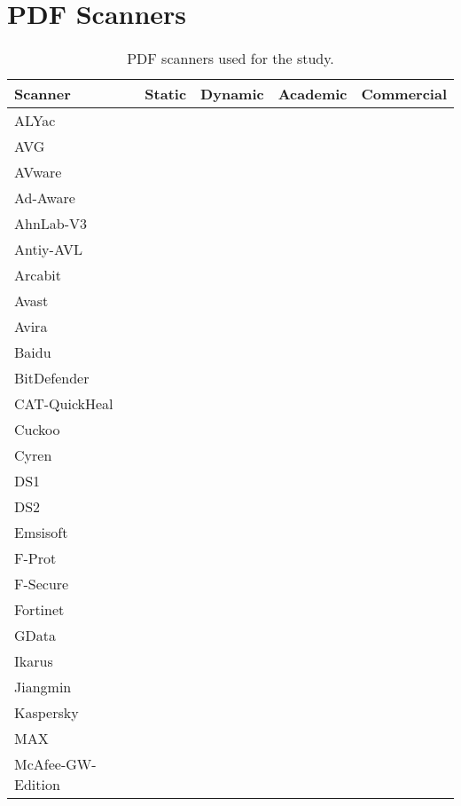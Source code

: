 \section{PDF Scanners}
\label{ss: analyzers}

\begin{table}[tb]
	\caption{PDF scanners used for the study.}
	\label{tab:analyzers}
	\footnotesize
	\setlength{\tabcolsep}{6pt}
    \renewcommand*{\arraystretch}{.6}
	\begin{tabular}{@{}lcccc@{}}
		\toprule
		Scanner & Static & Dynamic & Academic & Commercial \\
		\midrule
		ALYac & \cmark & & & \cmark \\
		AVG & \cmark & & & \cmark \\
		AVware & \cmark & & & \cmark \\
		Ad-Aware & \cmark & & & \cmark \\
		AhnLab-V3 & \cmark & & & \cmark \\
		Antiy-AVL & \cmark & & & \cmark \\
		Arcabit & \cmark & & & \cmark \\
		Avast & \cmark & & & \cmark \\
		Avira & \cmark & & & \cmark \\
		Baidu & \cmark & & & \cmark \\
		BitDefender & \cmark & & & \cmark \\
		CAT-QuickHeal & \cmark & & & \cmark \\
		Cuckoo & & \cmark & \cmark & \cmark \\
		Cyren & \cmark & & & \cmark \\
		DS1 & & \cmark & & \cmark \\%
		DS2 & & \cmark & & \cmark \\%
		Emsisoft & \cmark & & & \cmark \\
		F-Prot & \cmark & & & \cmark \\
		F-Secure & \cmark & & & \cmark \\
		Fortinet & \cmark & & & \cmark \\
		GData & \cmark & & & \cmark \\
		Ikarus & \cmark & & & \cmark \\
		Jiangmin & \cmark & & & \cmark \\
		Kaspersky & \cmark & & & \cmark \\
		MAX & \cmark & & & \cmark \\
		McAfee-GW-Edition & \cmark & & & \cmark \\

\end{tabular}
\end{table}
